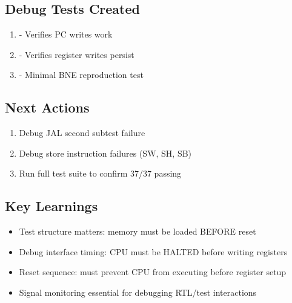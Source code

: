 \subsection{Debug Tests Created}\label{cr:fix:test-fix-summary:debug-tests-created}

\begin{record}

\begin{enumerate}
\def\labelenumi{\arabic{enumi}.}
\tightlist
\item
   - Verifies PC writes work
  \ok{}
\item
   - Verifies register
  writes persist \ok{}
\item
   - Minimal BNE reproduction
  test \ok{}
\end{enumerate}

\end{record}

\subsection{Next Actions}\label{cr:fix:test-fix-summary:next-actions}

\begin{record}

\begin{enumerate}
\def\labelenumi{\arabic{enumi}.}
\tightlist
\item
  Debug JAL second subtest failure
\item
  Debug store instruction failures (SW, SH, SB)
\item
  Run full test suite to confirm 37/37 passing
\end{enumerate}

\end{record}

\subsection{Key Learnings}\label{cr:fix:test-fix-summary:key-learnings}

\begin{record}

\begin{itemize}
\tightlist
\item
  Test structure matters: memory must be loaded BEFORE reset
\item
  Debug interface timing: CPU must be HALTED before writing registers
\item
  Reset sequence: must prevent CPU from executing before register setup
\item
  Signal monitoring essential for debugging RTL/test interactions
\end{itemize}

\end{record}


